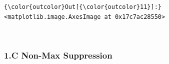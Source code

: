 \documentclass[11pt]{article}
\begin{document}
\begin{Verbatim}[commandchars=\\\{\}]
{\color{outcolor}Out[{\color{outcolor}11}]:} <matplotlib.image.AxesImage at 0x17c7ac28550>
\end{Verbatim}
            
    \begin{center}
    \end{center}
    { \hspace*{\fill} \\}
    
    \hypertarget{c-non-max-suppression}{%
\subsubsection{1.C Non-Max Suppression}\label{c-non-max-suppression}}
\end{document}
